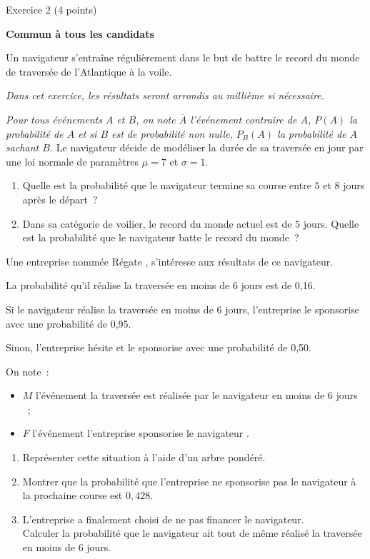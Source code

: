 
%
\begin{h2}Exercice 2 (4 points)\end{h2}
\par
\textbf{Commun  à tous les candidats}
\par
Un navigateur s'entraîne régulièrement dans le but de battre le record du monde de
traversée de l'Atlantique à la voile.
\par
\emph{Dans cet exercice, les résultats seront arrondis au millième si nécessaire.}
\par
\emph{Pour tous événements $A$ et $B$, on note $\overline{A}$ l'événement contraire de $A$, $P(A)$ la probabilité de $A$
et si $B$ est de probabilité non nulle, $P_B(A)$ la probabilité de $A$ sachant $B$.}
\medbreak
{}
\medbreak
Le navigateur décide de modéliser la durée de sa traversée en jour par une loi normale de
paramètres $\mu = 7$ et $\sigma= 1$.
\medbreak
\begin{enumerate}
     \item Quelle est la probabilité que le navigateur termine sa course entre $5$ et $8$ jours après le départ~?
     \item Dans sa catégorie de voilier, le record du monde actuel est de $5$ jours.
     Quelle est la probabilité que le navigateur batte le record du monde~?
\end{enumerate}
\medbreak
{}
\medbreak
Une entreprise nommée \og Régate \fg, s'intéresse aux résultats de ce navigateur.
\par
La probabilité qu'il réalise la traversée en moins de 6 jours est de 0,16.
\par
Si le navigateur réalise la traversée en moins de 6 jours, l'entreprise le sponsorise avec une probabilité de 0,95.
\par
Sinon, l'entreprise hésite et le sponsorise avec une probabilité de 0,50.
\par
On note~:
\begin{itemize}
     \item $M$ l'événement \og la traversée est réalisée par le navigateur en moins de 6 jours \fg~;
     \item $F$ l'événement \og l'entreprise sponsorise le navigateur \fg.
\end{itemize}
\medskip
\begin{enumerate}
     \item Représenter cette situation à l'aide d'un arbre pondéré.
     \item  Montrer que la probabilité que l'entreprise ne sponsorise pas le navigateur à la
     prochaine course est $0,428$.
     \item  L'entreprise a finalement choisi de ne pas financer le navigateur.
\\
     Calculer la probabilité que le navigateur ait tout de même réalisé la traversée en moins
     de $6$ jours.
\end{enumerate}
